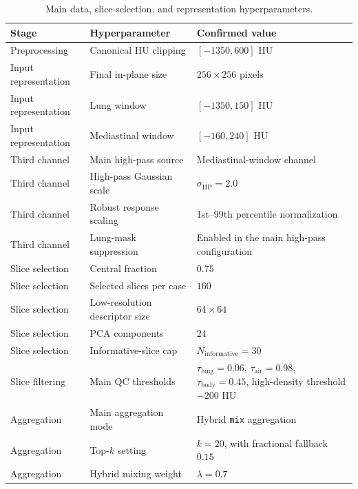 \begin{table}[H]
\centering
\small
\caption{Main data, slice-selection, and representation hyperparameters.}
\label{tab:main_pipeline_hyperparameters}
\begin{tabular}{p{}p{}p{}}
\toprule
Stage & Hyperparameter & Confirmed value \\
\midrule
Preprocessing & Canonical HU clipping & \([-1350, 600]\) HU \\
Input representation & Final in-plane size & \(256 \times 256\) pixels \\
Input representation & Lung window & \([-1350, 150]\) HU \\
Input representation & Mediastinal window & \([-160, 240]\) HU \\
Third channel & Main high-pass source & Mediastinal-window channel \\
Third channel & High-pass Gaussian scale & \(\sigma_{\mathrm{HP}}=2.0\) \\
Third channel & Robust response scaling & 1st--99th percentile normalization \\
Third channel & Lung-mask suppression & Enabled in the main high-pass configuration \\
Slice selection & Central fraction & \(0.75\) \\
Slice selection & Selected slices per case & \(160\) \\
Slice selection & Low-resolution descriptor size & \(64 \times 64\) \\
Slice selection & PCA components & \(24\) \\
Slice selection & Informative-slice cap & \(N_{\mathrm{informative}}=30\) \\
Slice filtering & Main QC thresholds & \(\tau_{\mathrm{lung}}=0.06\), \(\tau_{\mathrm{air}}=0.98\), \(\tau_{\mathrm{body}}=0.45\), high-density threshold \(-200\) HU \\
Aggregation & Main aggregation mode & Hybrid \texttt{mix} aggregation \\
Aggregation & Top-\(k\) setting & \(k=20\), with fractional fallback \(0.15\) \\
Aggregation & Hybrid mixing weight & \(\lambda=0.7\) \\
\bottomrule
\end{tabular}
\end{table}

